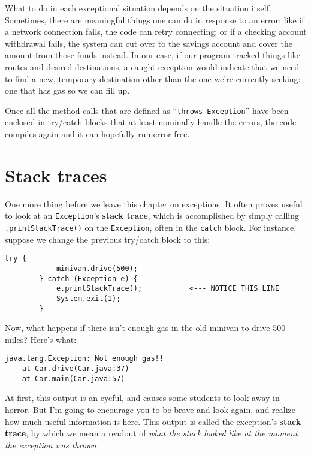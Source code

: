 What to do in each exceptional situation depends on the situation itself.
Sometimes, there are meaningful things one can do in response to an error:
like if a network connection fails, the code can retry connecting; or if a
checking account withdrawal fails, the system can cut over to the savings
account and cover the amount from those funds instead. In our case, if our
program tracked things like routes and desired destinations, a caught
exception would indicate that we need to find a new, temporary destination
other than the one we're currently seeking: one that has gas so we can fill
up.

Once all the method calls that are defined as ``\texttt{throws Exception}''
have been enclosed in try/catch blocks that at least nominally handle the
errors, the code compiles again and it can hopefully run error-free.

\section{Stack traces}

One more thing before we leave this chapter on exceptions. It often proves
useful to look at an \texttt{Exception}'s \textbf{stack trace}, which is
accomplished by simply calling \texttt{.printStackTrace()} on the
\texttt{Exception}, often in the \texttt{catch} block. For instance, suppose
we change the previous try/catch block to this:

\begin{Verbatim}[samepage=true,fontsize=\footnotesize,frame=single]
        try {
            minivan.drive(500);
        } catch (Exception e) {
            e.printStackTrace();           <--- NOTICE THIS LINE
            System.exit(1);
        }
\end{Verbatim}

Now, what happens if there isn't enough gas in the old minivan to drive 500
miles? Here's what:

\begin{Verbatim}[fontsize=\small,samepage=true,frame=none]
java.lang.Exception: Not enough gas!!
    at Car.drive(Car.java:37)
    at Car.main(Car.java:57)
\end{Verbatim}

At first, this output is an eyeful, and causes some students to look away in
horror. But I'm going to encourage you to be brave and look again, and realize
how much useful information is here. This output is called the exception's
\textbf{stack trace}, by which we mean a readout of \textit{what the stack
looked like at the moment the exception was thrown.}

